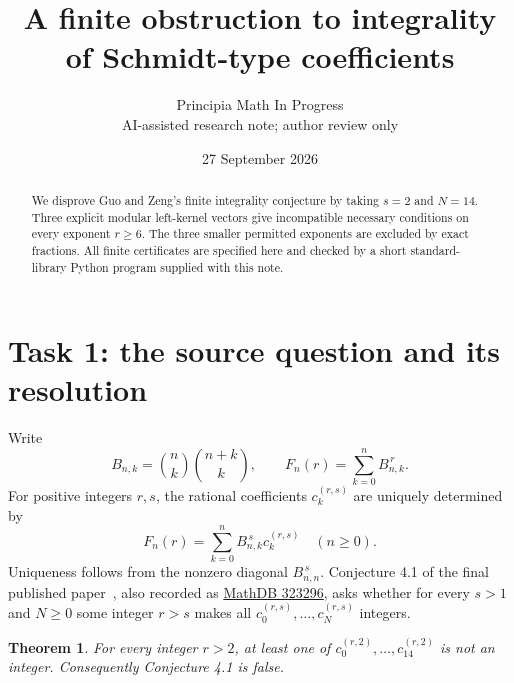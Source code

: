 \documentclass[11pt]{article}
\title{A finite obstruction to integrality of Schmidt-type coefficients}
\author{Principia Math In Progress\\\small AI-assisted research note; author review only}
\date{27 September 2026}
\newtheorem{theorem}{Theorem}
\begin{document}
\maketitle
\begin{abstract}
We disprove Guo and Zeng's finite integrality conjecture by taking
$s=2$ and $N=14$. Three explicit modular left-kernel vectors give
incompatible necessary conditions on every exponent $r\ge6$.
The three smaller permitted exponents are excluded by exact fractions.
All finite certificates are specified here and checked by a short
standard-library Python program supplied with this note.
\end{abstract}

\section*{Task 1: the source question and its resolution}
Write
\[
 B_{n,k}=\binom nk\binom{n+k}{k},\qquad
 F_n(r)=\sum_{k=0}^n B_{n,k}^{\,r}.
\]
For positive integers $r,s$, the rational coefficients $c_k^{(r,s)}$
are uniquely determined by
\begin{equation}\label{eq:def}
 F_n(r)=\sum_{k=0}^n B_{n,k}^{\,s}c_k^{(r,s)}\quad(n\ge0).
\end{equation}
Uniqueness follows from the nonzero diagonal $B_{n,n}^{\,s}$.
Conjecture 4.1 of the final published paper~\cite{GZ}, also recorded as
\href{https://mathdb.com/p/323296}{MathDB 323296}, asks whether for every
$s>1$ and $N\ge0$ some integer $r>s$ makes all $c_0^{(r,s)},\ldots,c_N^{(r,s)}$
integers.

\begin{theorem}\label{thm:main}
For every integer $r>2$, at least one of
$c_0^{(r,2)},\ldots,c_{14}^{(r,2)}$ is not an integer.
Consequently Conjecture 4.1 is false.
\end{theorem}
\end{document}
